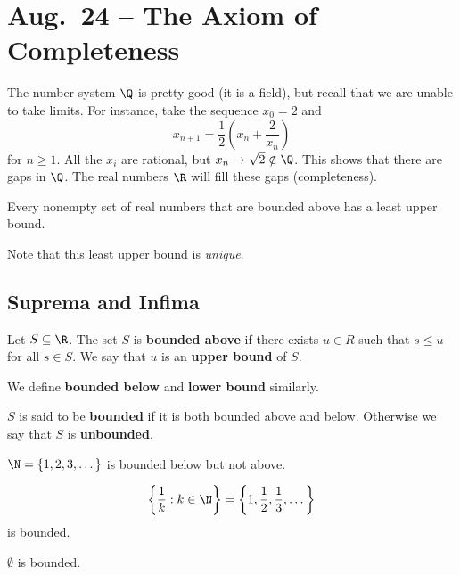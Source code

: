 \chapter{Aug.~24 -- The Axiom of Completeness}

The number system $\Q$ is pretty good (it is a field),
but recall that we are unable to take limits. For
instance, take the sequence $x_0 = 2$ and
\[x_{n+1} = \frac{1}{2}\left(x_n + \frac{2}{x_n}\right)\]
for $n \ge 1$. All the $x_i$ are rational, but
$x_n \to \sqrt{2} \notin \Q$. This shows that there are
gaps in $\Q$. The real numbers $\R$ will fill
these gaps (completeness).

\begin{axiom}
Every nonempty set of real numbers that are bounded
above has a least upper bound.
\end{axiom}

Note that this least upper bound is \textit{unique}.

\section{Suprema and Infima}

\begin{definition}
  Let $S \subseteq \R$. The set $S$ is
  \textbf{bounded above} if there exists $u \in R$
  such that  $s \le u$ for all $s \in S$.
  We say that $u$ is an \textbf{upper bound} of $S$.
\end{definition}

We define \textbf{bounded below} and \textbf{lower bound}
similarly.

\begin{definition}
  $S$ is said to be \textbf{bounded} if it is
  both bounded above and below. Otherwise we say that
  $S$ is \textbf{unbounded}.
\end{definition}

\begin{tcolorbox}
  $\N = \{1, 2, 3, \dots\}$ is bounded below but not
  above.
\end{tcolorbox}

\begin{tcolorbox}
  \[\left\{\frac{1}{k} : k \in \N\right\} = \left\{1, \frac{1}{2}, \frac{1}{3}, \dots\right\}\]
  is bounded.
\end{tcolorbox}

\begin{tcolorbox}
  $\emptyset$ is bounded.
\end{tcolorbox}

